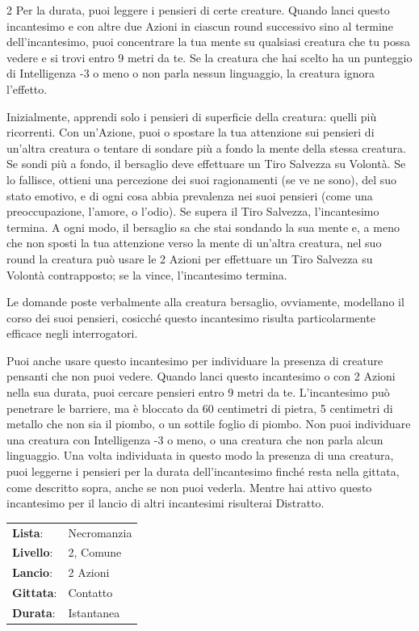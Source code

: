 \begin{multicols}{2}
Per la durata, puoi leggere i pensieri di certe creature. Quando lanci questo incantesimo e con altre due Azioni in ciascun round successivo sino al termine dell'incantesimo, puoi concentrare la tua mente su qualsiasi creatura che tu possa vedere e si trovi entro 9 metri da te. Se la creatura che hai scelto ha un punteggio di Intelligenza -3 o meno o non parla nessun linguaggio, la creatura ignora l'effetto.

Inizialmente, apprendi solo i pensieri di superficie della creatura: quelli più ricorrenti. Con un'Azione, puoi o spostare la tua attenzione sui pensieri di un'altra creatura o tentare di sondare più a fondo la mente della stessa creatura. Se sondi più a fondo, il bersaglio deve effettuare un Tiro Salvezza su Volontà. Se lo fallisce, ottieni una percezione dei suoi ragionamenti (se ve ne sono), del suo stato emotivo, e di ogni cosa abbia prevalenza nei suoi pensieri (come una preoccupazione, l'amore, o l'odio). Se supera il Tiro Salvezza, l'incantesimo termina. A ogni modo, il bersaglio sa che stai sondando la sua mente e, a meno che non sposti la tua attenzione verso la mente di un'altra creatura, nel suo round la creatura può usare le 2 Azioni per effettuare un Tiro Salvezza su Volontà contrapposto; se la vince, l'incantesimo termina.

Le domande poste verbalmente alla creatura bersaglio, ovviamente, modellano il corso dei suoi pensieri, cosicché questo incantesimo risulta particolarmente efficace negli interrogatori.

Puoi anche usare questo incantesimo per individuare la presenza di creature pensanti che non puoi vedere. Quando lanci questo incantesimo o con 2 Azioni nella sua durata, puoi cercare pensieri entro 9 metri da te. L'incantesimo può penetrare le barriere, ma è bloccato da 60 centimetri di pietra, 5 centimetri di metallo che non sia il piombo, o un sottile foglio di piombo. Non puoi individuare una creatura con Intelligenza -3 o meno, o una creatura che non parla alcun linguaggio. Una volta individuata in questo modo la presenza di una creatura, puoi leggerne i pensieri per la durata dell'incantesimo finché resta nella gittata, come descritto sopra, anche se non puoi vederla.
Mentre hai attivo questo incantesimo per il lancio di altri incantesimi risulterai Distratto.

\noindent\begin{tabularx}{\linewidth}{p{1.9cm}X}
	\rowcolor{gray!20}\textbf{Lista}: & Necromanzia \\
	\textbf{Livello}: & 2, Comune \\
	\rowcolor{gray!20}\textbf{Lancio}: & 2 Azioni \\
	\textbf{Gittata}: & Contatto \\
	\rowcolor{gray!20}\textbf{Durata}: & Istantanea \\
\end{tabularx}\smallskip


\end{multicols}
